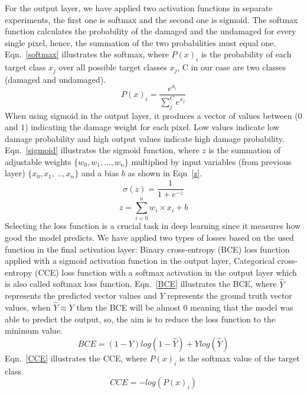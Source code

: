 \documentclass[preprint,9pt]{elsarticle}
\begin{document}
For the output layer, we have applied two activation functions in separate experiments, the first one is softmax and the second one is sigmoid. 
The softmax function calculates the probability of the damaged and the undamaged for every single pixel, hence, the summation of the two probabilities must equal one. Eqn.~\ref{softmax} illustrates the softmax, where \(P(x)_{i}\) is the probability of each target class \(x_{j}\) over all possible target classes \(x_{j}\), C in our case are two classes  (damaged and undamaged).
\begin{equation}
P(x)_{i} = \frac{e^{x_{i}}}{\sum_{j}^{C} e^{x_{j}}}
\label{softmax}
\end{equation} 
When using sigmoid in the output layer, it produces a vector of values between (\(0\) and \(1\)) indicating the damage weight for each pixel. 
Low values indicate low damage probability and high output values indicate high damage probability. Eqn.~\ref{sigmoid} illustrates the sigmoid function, 
where \(z\) is the summation of adjustable weights \(\{w_0,w_1,...,w_n \}\) multiplied by input variables (from previous layer) \(\{x_0,x_1,_...,x_n\}\) and a bias \(b\) as shown in Eqn~\ref{z}.
\begin{equation}
	\sigma(z) = \frac{1}{1+e^{-z}}
	\label{sigmoid}
\end{equation}
\begin{equation}
	z= \sum_{i=0}^{n}  w_i\times x_i +b
	\label{z}
\end{equation}
Selecting the loss function is a crucial task in deep learning since it measures how good the model predicts.
We have applied two types of losses based on the used function in the final activation layer: Binary cross-entropy (BCE) loss function applied with a sigmoid activation function in the output layer, Categorical cross-entropy (CCE) loss function with a softmax activation in the output layer which is also called softmax loss function.
Eqn.~\ref{BCE} illustrates the BCE, where \(\hat{Y}\) represents the predicted vector values and \(Y\) represents the ground truth vector values, when \(\hat{Y} \approx Y\) then the BCE will be almost \(0\) meaning that the model was able to predict the output, so, the aim is to reduce the loss function to the minimum value.
\begin{equation}
	BCE = (1-Y)log(1-\hat{Y})+Ylog(\hat{Y})
	\label{BCE}
\end{equation}
Eqn.~\ref{CCE} illustrates the CCE, where \( P(x)_{i}\) is the softmax value of the target class. 
\begin{equation}
CCE = -log\left( P(x)_{i} \right)
\label{CCE}
\end{equation}
\end{document}
